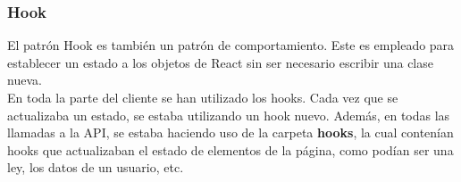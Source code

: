 \subsubsection{Hook}

El patrón Hook \cite{hooks} es también un patrón de comportamiento. Este es empleado para establecer un estado a los objetos de React sin ser necesario escribir una clase nueva.
\\

En toda la parte del cliente se han utilizado los hooks. Cada vez que se actualizaba un estado, se estaba utilizando un hook nuevo. Además, en todas las llamadas a la API, se estaba haciendo uso de la carpeta {\bf hooks}, la cual contenían hooks que actualizaban el estado de elementos de la página, como podían ser una ley, los datos de un usuario, etc.